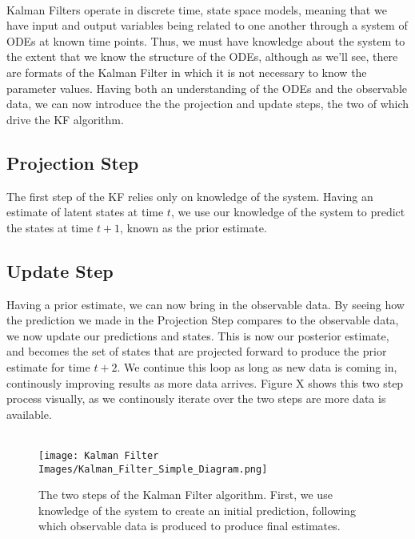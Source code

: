 \\
Kalman Filters operate in discrete time, state space models, meaning that we have input and output variables being related to one another through a system of ODEs at known time points. Thus, we must have knowledge about the system to the extent that we know the structure of the ODEs, although as we'll see, there are formats of the Kalman Filter in which it is not necessary to know the parameter values. Having both an understanding of the ODEs and the observable data, we can now introduce the the projection and update steps, the two of which drive the KF algorithm. 
\subsection{Projection Step}
The first step of the KF relies only on knowledge of the system. Having an estimate of latent states at time $t$, we use our knowledge of the system to predict the states at time $t + 1$, known as the prior estimate.
\subsection{Update Step}
Having a prior estimate, we can now bring in the observable data. By seeing how the prediction we made in the Projection Step compares to the observable data, we now update our predictions and states. This is now our posterior estimate, and becomes the set of states that are projected forward to produce the prior estimate for time $t+2$. We continue this loop as long as new data is coming in, continously improving results as more data arrives. Figure X shows this two step process visually, as we continously iterate over the two steps are more data is available. \\
\\
\begin{figure}[H]
    \centering
    \texttt{[image: Kalman Filter Images/Kalman\_Filter\_Simple\_Diagram.png]}
    \caption{The two steps of the Kalman Filter algorithm. First, we use knowledge of the system to create an initial prediction, following which observable data is produced to produce final estimates.}

\end{figure}

